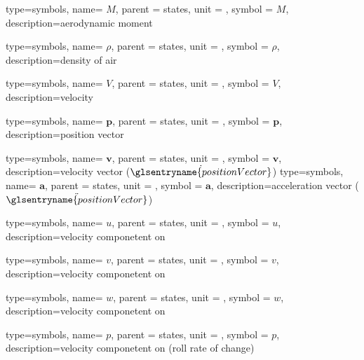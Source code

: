 {type=symbols,
  name= \ensuremath{M},
  parent = {states},
  unit = \unexpanded{\si{\newton\meter}},
  symbol = \ensuremath{M},
  description={aerodynamic moment}
}

{type=symbols,
  name= \ensuremath{\rho},
  parent = {states},
  unit = \unexpanded{\si{\kilogram\per\meter\cubed}},
  symbol = \ensuremath{\rho},
  description={density of air}
}

{type=symbols,
  name= \ensuremath{V},
  parent = {states},
  unit = \unexpanded{\si{\meter\per\second}},
  symbol = \ensuremath{V},
  description={velocity}
}

{type=symbols,
  name= \ensuremath{\mathbf{p}},
  parent = {states},
  unit = \unexpanded{\si{\meter}},
  symbol = \ensuremath{\mathbf{p}},
  description={position vector}
}

{type=symbols,
  name= \ensuremath{\mathbf{v}},
  parent = {states},
  unit = \unexpanded{\si{\meter\per\second}},
  symbol = \ensuremath{\mathbf{v}},
  description={velocity vector ($\dot{\glsentryname{positionVector}}$)}
}
{type=symbols,
  name= \ensuremath{\mathbf{a}},
  parent = {states},
  unit = \unexpanded{\si{\meter\per\second\squared}},
  symbol = \ensuremath{\mathbf{a}},
  description={acceleration vector ($\ddot{\glsentryname{positionVector}}$)}
}


{type=symbols,
  name= \ensuremath{u},
  parent = {states},
  unit = \unexpanded{\si{\meter\per\second}},
  symbol = \ensuremath{u},
  description={velocity componetent on }
}

{type=symbols,
  name= \ensuremath{v},
  parent = {states},
  unit = \unexpanded{\si{\meter\per\second}},
  symbol = \ensuremath{v},
  description={velocity componetent on }
}

{type=symbols,
  name= \ensuremath{w},
  parent = {states},
  unit = \unexpanded{\si{\meter\per\second}},
  symbol = \ensuremath{w},
  description={velocity componetent on }
}

{type=symbols,
  name= \ensuremath{p},
  parent = {states},
  unit = \unexpanded{\si{\radian\per\second}},
  symbol = \ensuremath{p},
  description={velocity componetent on  (roll rate of change)}
}

